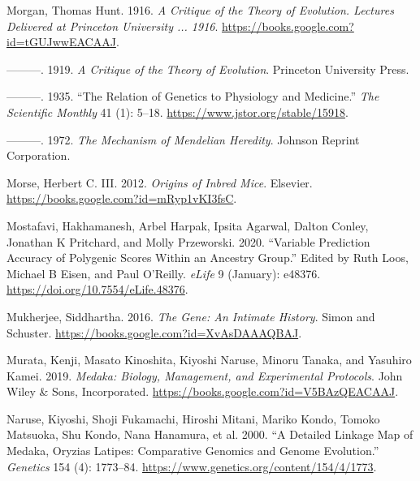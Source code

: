 \documentclass[
]{book}
\newlength{\cslhangindent}
\newlength{\cslentryspacingunit} %
\newenvironment{CSLReferences}[2] %
 {%
  \setlength{\parindent}{0pt}
  \ifodd #1
  \let\oldpar\par
  \def\par{\hangindent=\cslhangindent\oldpar}
  \fi
  \setlength{\parskip}{#2\cslentryspacingunit}
 }%
 {}
\begin{document}
\begin{CSLReferences}{1}{0}
\leavevmode{}%
Morgan, Thomas Hunt. 1916. \emph{A {Critique} of the {Theory} of {Evolution}. {Lectures Delivered} at {Princeton University} ... 1916}. \url{https://books.google.com?id=tGUJwwEACAAJ}.

\leavevmode{}%
---------. 1919. \emph{A {Critique} of the {Theory} of {Evolution}}. {Princeton University Press}.

\leavevmode{}%
---------. 1935. {``The {Relation} of {Genetics} to {Physiology} and {Medicine}.''} \emph{The Scientific Monthly} 41 (1): 5--18. \url{https://www.jstor.org/stable/15918}.

\leavevmode{}%
---------. 1972. \emph{The {Mechanism} of {Mendelian Heredity}}. {Johnson Reprint Corporation}.

\leavevmode{}%
Morse, Herbert C. III. 2012. \emph{Origins of {Inbred Mice}}. {Elsevier}. \url{https://books.google.com?id=mRyp1vKI3fsC}.

\leavevmode{}%
Mostafavi, Hakhamanesh, Arbel Harpak, Ipsita Agarwal, Dalton Conley, Jonathan K Pritchard, and Molly Przeworski. 2020. {``Variable Prediction Accuracy of Polygenic Scores Within an Ancestry Group.''} Edited by Ruth Loos, Michael B Eisen, and Paul O'Reilly. \emph{eLife} 9 (January): e48376. \url{https://doi.org/10.7554/eLife.48376}.

\leavevmode{}%
Mukherjee, Siddhartha. 2016. \emph{The {Gene}: {An Intimate History}}. {Simon and Schuster}. \url{https://books.google.com?id=XvAsDAAAQBAJ}.

\leavevmode{}%
Murata, Kenji, Masato Kinoshita, Kiyoshi Naruse, Minoru Tanaka, and Yasuhiro Kamei. 2019. \emph{Medaka: {Biology}, {Management}, and {Experimental Protocols}}. {John Wiley \& Sons, Incorporated}. \url{https://books.google.com?id=V5BAzQEACAAJ}.

\leavevmode{}%
Naruse, Kiyoshi, Shoji Fukamachi, Hiroshi Mitani, Mariko Kondo, Tomoko Matsuoka, Shu Kondo, Nana Hanamura, et al. 2000. {``A {Detailed Linkage Map} of {Medaka}, {Oryzias} Latipes: {Comparative Genomics} and {Genome Evolution}.''} \emph{Genetics} 154 (4): 1773--84. \url{https://www.genetics.org/content/154/4/1773}.


\end{CSLReferences}
\end{document}
